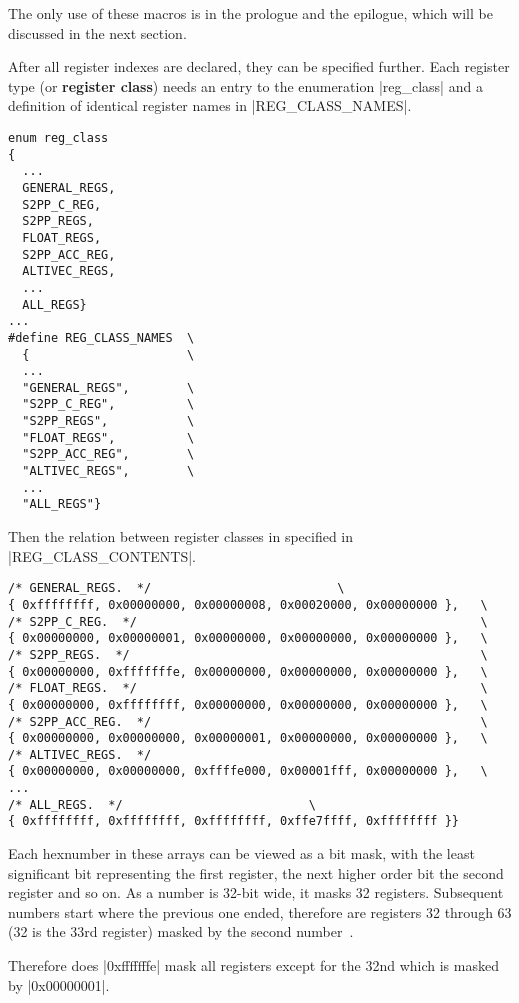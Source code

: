 The only use of these macros is in the prologue and the epilogue, which will be discussed in the next section.

After all register indexes are declared, they can be specified further.
Each register type (or \textbf{register class}) needs an entry to the enumeration |reg_class| and a definition of identical register names in |REG_CLASS_NAMES|.
\begin{lstlisting}[multicols=2]
enum reg_class
{
  ...
  GENERAL_REGS,
  S2PP_C_REG,
  S2PP_REGS,
  FLOAT_REGS,
  S2PP_ACC_REG,
  ALTIVEC_REGS,
  ...
  ALL_REGS}
...
#define REG_CLASS_NAMES  \
  {                      \
  ...
  "GENERAL_REGS",        \
  "S2PP_C_REG",          \
  "S2PP_REGS",           \
  "FLOAT_REGS",          \
  "S2PP_ACC_REG",        \
  "ALTIVEC_REGS",        \
  ...
  "ALL_REGS"}
  \end{lstlisting}

Then the relation between register classes in specified in |REG_CLASS_CONTENTS|.
\begin{lstlisting}
/* GENERAL_REGS.  */                          \
{ 0xffffffff, 0x00000000, 0x00000008, 0x00020000, 0x00000000 },   \
/* S2PP_C_REG.  */                                                \
{ 0x00000000, 0x00000001, 0x00000000, 0x00000000, 0x00000000 },   \
/* S2PP_REGS.  */                                                 \
{ 0x00000000, 0xfffffffe, 0x00000000, 0x00000000, 0x00000000 },   \
/* FLOAT_REGS.  */                                                \
{ 0x00000000, 0xffffffff, 0x00000000, 0x00000000, 0x00000000 },   \
/* S2PP_ACC_REG.  */                                              \
{ 0x00000000, 0x00000000, 0x00000001, 0x00000000, 0x00000000 },   \
/* ALTIVEC_REGS.  */
{ 0x00000000, 0x00000000, 0xffffe000, 0x00001fff, 0x00000000 },   \
...
/* ALL_REGS.  */                          \
{ 0xffffffff, 0xffffffff, 0xffffffff, 0xffe7ffff, 0xffffffff }}
\end{lstlisting}

Each hexnumber in these arrays can be viewed as a bit mask, with the least significant bit representing the first register, the next higher order bit the second register and so on.
As a number is 32-bit wide, it masks 32 registers.
Subsequent numbers start where the previous one ended, therefore are registers 32 through 63 (32 is the 33rd register) masked by the second number~\cite[ch.~17.8]{GCCint}.

Therefore does |0xfffffffe| mask all registers except for the 32nd which is masked by |0x00000001|.

